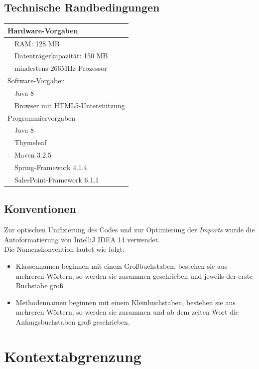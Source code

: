 \documentclass[pdftex,12pt,a4paper]{article}
\begin{document}
\subsection{Technische Randbedingungen}
\begin{tabular}{|p{\half}|p{\half}|} \hline
\multicolumn{2}{|p{\textwidth}|}{Hardware-Vorgaben}\\ \hline
& RAM: 128 MB\\ \cline{2-2}
& Datentr\"agerkapazit\"at: 150 MB\\ \cline{2-2}
& mindestens 266MHz-Prozessor\\ \hline
\multicolumn{2}{|p{\textwidth}|}{Software-Vorgaben}\\ \hline
& Java 8\\ \cline{2-2}
& Browser mit HTML5-Unterst\"utzung\\ \hline
\multicolumn{2}{|p{\textwidth}|}{Programmiervorgaben}\\ \hline
& Java 8\\ \cline{2-2}
& Thymeleaf\\ \cline{2-2}
& Maven 3.2.5\\ \cline{2-2}
& Spring-Framework 4.1.4\\ \cline{2-2}
& SalesPoint-Framework 6.1.1\\ \hline


\end{tabular}



\subsection{Konventionen}
Zur optischen Unifizierung des Codes und zur Optimierung der {\textit{Imports}} wurde die Autoformatierung von IntelliJ IDEA 14 verwendet.\\
Die Namenskonvention lautet wie folgt:\\
\begin{itemize}
\item Klassennamen beginnen mit einem Gro\ss{}buchstaben, bestehen sie aus mehreren W\"ortern, so werden sie zusammen geschrieben und jeweils der erste Buchstabe gro\ss{}
\item Methodennamen beginnen mit einem Kleinbuchstaben, bestehen sie aus mehreren W\"ortern, so werden sie zusammen und ab dem zeiten Wort die Anfangsbuchstaben gro\ss{} geschrieben.
\end{itemize}

\newpage
\section{Kontextabgrenzung}
\end{document}
